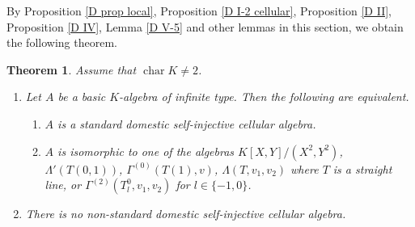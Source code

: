 \documentclass[12pt]{amsart}
\newtheorem{thm}{Theorem}[section]
\numberwithin{equation}{thm}
\newcommand\cha{\operatorname{char}}
\newcounter{ni}
\begin{document}
{By Proposition \ref{D prop local}, Proposition \ref{D I-2 cellular}, Proposition \ref{D II}, 
Proposition \ref{D IV}, Lemma \ref{D V-5} and other lemmas in this section, we obtain the following theorem.

\begin{thm}
\label{D main result}
Assume that $\cha K\neq 2$.
\begin{enumerate}
\item Let $A$ be a basic $K$-algebra of infinite type. Then the following are equivalent.
\begin{enumerate}
\item $A$ is a standard domestic self-injective cellular algebra.
\item $A$ is isomorphic to one of the algebras 
$K[X,Y]/(X^2, Y^2)$, $\Lambda'(T(0,1))$, $\Gamma^{(0)}(T(1),v)$, 
$\Lambda(T,v_{1},v_{2})$ where $T$ is a straight line, or $\Gamma^{(2)}(T_{l}^{0},v_1,v_2)$ for $l\in\{-1,0\}$.
\end{enumerate}

\item There is no non-standard domestic self-injective cellular algebra.
\end{enumerate}
\end{thm}

}
\end{document}
